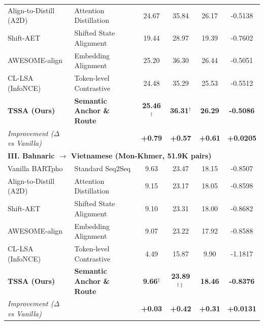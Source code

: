\documentclass[11pt,a4paper]{article}
\begin{document}
\begin{table}[htbp]
{\begin{tabular}{llcccc}
Align-to-Distill (A2D) & Attention Distillation & 24.67 & 35.84 & 26.17 & -0.5138 \\
Shift-AET & Shifted State Alignment & 19.44 & 28.97 & 19.39 & -0.7602 \\
AWESOME-align & Embedding Alignment & 25.20 & 36.30 & 26.44 & -0.5051 \\
CL-LSA (InfoNCE) & Token-level Contrastive & 24.48 & 35.29 & 25.53 & -0.5512 \\
\rowcolor{highlightgreen}
\textbf{TSSA (Ours)} & \textbf{Semantic Anchor \& Route} & \textbf{25.46}$^\dagger$ & \textbf{36.31}$^\dagger$ & \textbf{26.29} & \textbf{-0.5086} \\
\textit{Improvement ($\Delta$ vs Vanilla)} & & \textcolor{topgreen}{\textbf{+0.79}} & \textcolor{topgreen}{\textbf{+0.57}} & \textcolor{topgreen}{\textbf{+0.61}} & \textcolor{topgreen}{\textbf{+0.0205}} \\
\midrule
\multicolumn{6}{l}{\textbf{III. Bahnaric $\rightarrow$ Vietnamese (Mon-Khmer, 51.9K pairs)}} \\
Vanilla BARTpho & Standard Seq2Seq & 9.63 & 23.47 & 18.15 & -0.8507 \\
Align-to-Distill (A2D) & Attention Distillation & 9.15 & 23.17 & 18.05 & -0.8598 \\
Shift-AET & Shifted State Alignment & 9.10 & 23.31 & 18.00 & -0.8682 \\
AWESOME-align & Embedding Alignment & 9.07 & 23.22 & 17.92 & -0.8588 \\
CL-LSA (InfoNCE) & Token-level Contrastive & 4.49 & 15.87 & 9.90 & -1.1817 \\
\rowcolor{highlightgreen}
\textbf{TSSA (Ours)} & \textbf{Semantic Anchor \& Route} & \textbf{9.66}$^\ddagger$ & \textbf{23.89}$^{\dagger\ddagger}$ & \textbf{18.46} & \textbf{-0.8376} \\
\textit{Improvement ($\Delta$ vs Vanilla)} & & \textcolor{topgreen}{\textbf{+0.03}} & \textcolor{topgreen}{\textbf{+0.42}} & \textcolor{topgreen}{\textbf{+0.31}} & \textcolor{topgreen}{\textbf{+0.0131}} \\
\bottomrule
\end{tabular}
}
\end{table}
\end{document}
